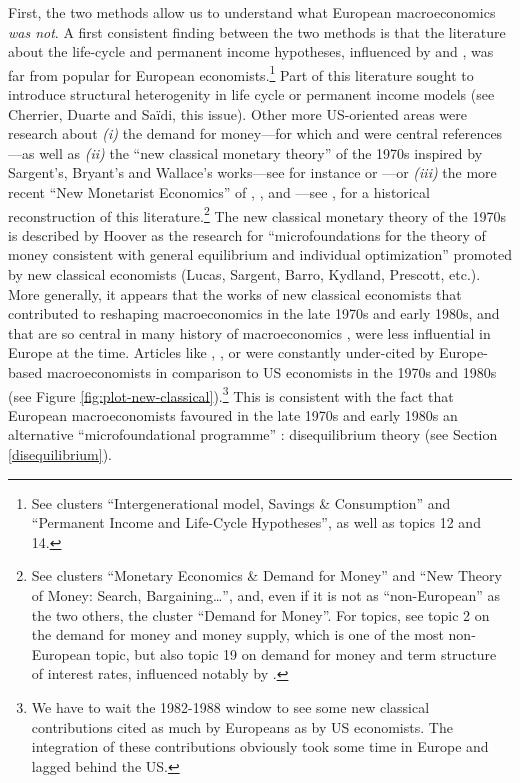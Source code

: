 \documentclass[]{elsarticle} %
\begin{document}
First, the two methods allow us to understand what European
macroeconomics \emph{was not}. A first consistent finding between the
two methods is that the literature about the life-cycle and permanent
income hypotheses, influenced by \citet{friedman1957} and
\citet{hall1978b}, was far from popular for European
economists.\footnote{See clusters ``Intergenerational model, Savings \&
  Consumption'' and ``Permanent Income and Life-Cycle Hypotheses'', as
  well as topics 12 and 14.} Part of this literature sought to introduce
structural heterogenity in life cycle or permanent income models (see
Cherrier, Duarte and Saïdi, this issue). Other more US-oriented areas
were research about \emph{(i)} the demand for money---for which
\citet{baumol1952} and \citet{friedman1963} were central references---as
well as \emph{(ii)} the ``new classical monetary theory'' \citep[chapter
6]{hoover1988} of the 1970s inspired by Sargent's, Bryant's and
Wallace's works---see for instance \citet{bryant1979} or
\citet{sargent1982}---or \emph{(iii)} the more recent ``New Monetarist
Economics'' of \citet{kiyotaki1989}, \citet{kiyotaki1993}, and
\citet{trejos1995}---see \citet[chapter 2]{frasser2020}, for a
historical reconstruction of this literature.\footnote{See clusters
  ``Monetary Economics \& Demand for Money'' and ``New Theory of Money:
  Search, Bargaining\ldots{}'', and, even if it is not as
  ``non-European'' as the two others, the cluster ``Demand for Money''.
  For topics, see topic 2 on the demand for money and money supply,
  which is one of the most non-European topic, but also topic 19 on
  demand for money and term structure of interest rates, influenced
  notably by \citet{fama1975}.} The new classical monetary theory of the
1970s is described by Hoover \citeyearpar[111]{hoover1988} as the
research for ``microfoundations for the theory of money consistent with
general equilibrium and individual optimization'' promoted by new
classical economists (Lucas, Sargent, Barro, Kydland, Prescott, etc.).
More generally, it appears that the works of new classical economists
that contributed to reshaping macroeconomics in the late 1970s and early
1980s, and that are so central in many history of macroeconomics
\citep{devroey2016}, were less influential in Europe at the time.
Articles like \citet{lucas1972}, \citet{lucas1973}, \citet{sargent1975}
or \citet{barro1976} were constantly under-cited by Europe-based
macroeconomists in comparison to US economists in the 1970s and 1980s
(see Figure \ref{fig:plot-new-classical}).\footnote{We have to wait the
  1982-1988 window to see some new classical contributions cited as much
  by Europeans as by US economists. The integration of these
  contributions obviously took some time in Europe and lagged behind the
  US.} This is consistent with the fact that European macroeconomists
favoured in the late 1970s and early 1980s an alternative
``microfoundational programme'' \citep{hoover2012}: disequilibrium
theory (see Section \ref{disequilibrium}).
\end{document}
